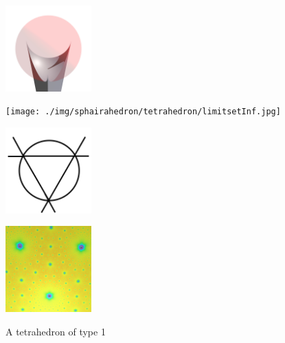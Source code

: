 \documentclass[suppldata, dvipdfmx]{interact}
\theoremstyle{plain}%
\theoremstyle{definition}
\theoremstyle{remark}
\theoremstyle{problemstyle}
\begin{document}
\begin{figure}[h!tbp]
  \begin{minipage}[t]{0.23\textwidth}
   \centering
   \includegraphics[width=1.3in,
   keepaspectratio]{./img/sphairahedron/tetrahedron/sphairahedronInf.jpg}
   \subcaption{}
   \label{fig:tetrahedronInf}
  \end{minipage}
  \hspace*{\fill}
  \begin{minipage}[t]{0.23\textwidth}
   \centering
   \texttt{[image: ./img/sphairahedron/tetrahedron/limitsetInf.jpg]}
   \subcaption{}
   \label{fig:tetrahedronLimitInf}
  \end{minipage}
 \hspace*{\fill}
  \begin{minipage}[t]{0.23\textwidth}
   \centering
   \includegraphics[width=1.3in, keepaspectratio]{./img/HexahedraWithSphericalFaces/tetrahedron/slice_a.jpg}
   \subcaption{}
   \label{fig:tetrahedronSliceA}
  \end{minipage}
 \hspace*{\fill}
  \begin{minipage}[t]{0.23\textwidth}
   \centering
   \includegraphics[width=1.3in, keepaspectratio]{./img/sphairahedron/tetrahedron/limitsetAbove_a.jpg}
   \subcaption{}
   \label{fig:tetrahedronLimitsetAboveA}
  \end{minipage}
 \hspace*{\fill}
 \caption{A tetrahedron of type 1}
 \label{fig:tetrahedronInf_a}
\end{figure}
\end{document}
